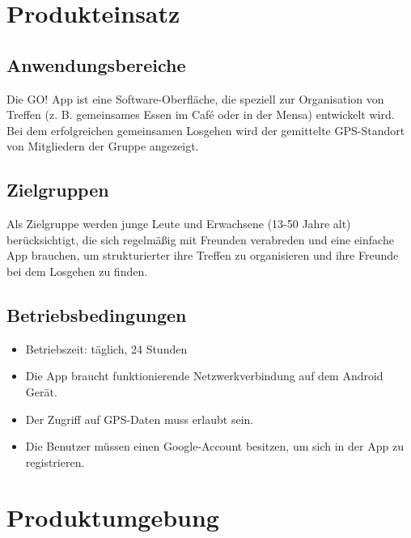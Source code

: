 \documentclass[parskip=full]{scrartcl}
\begin{document}
\newpage
\section{Produkteinsatz}
\subsection{Anwendungsbereiche}
Die GO! App ist eine Software-Oberfläche, die speziell zur Organisation von Treffen (z. B. gemeinsames Essen im Café oder in der Mensa) entwickelt wird. Bei dem erfolgreichen gemeinsamen Losgehen wird der gemittelte GPS-Standort von Mitgliedern der Gruppe angezeigt.
 
\subsection{Zielgruppen}
Als Zielgruppe werden junge Leute und Erwachsene (13-50 Jahre alt) berücksichtigt, die sich regelmäßig mit Freunden verabreden und eine einfache App brauchen, um strukturierter ihre Treffen zu organisieren und ihre Freunde bei dem Losgehen zu finden.

\subsection{Betriebsbedingungen}\label{Betriebsbedingungen}
\begin{itemize}
	\item Betriebszeit: täglich, 24 Stunden
	\item Die App braucht funktionierende Netzwerkverbindung auf dem Android Gerät.\\
	\item Der Zugriff auf GPS-Daten muss erlaubt sein.\\
	\item Die Benutzer müssen einen \gls{Google-Account} besitzen, um sich in der App zu registrieren.
\end{itemize}

\newpage
\section{Produktumgebung}
\end{document}
